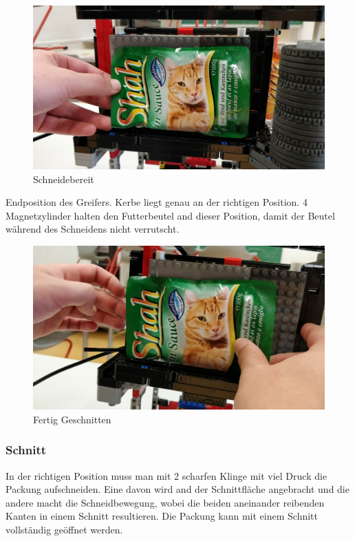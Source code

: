 \begin{figure}[H]
\begin{center}
\includegraphics[width=13cm]{Bilder/Ablauf_1_png/Schneidebereit.jpeg}
\caption{Schneidebereit}
\end{center}
\end{figure}

Endposition des Greifers. Kerbe liegt genau an der richtigen Position. 4 Magnetzylinder halten den Futterbeutel and dieser Position, damit der Beutel während des Schneidens nicht verrutscht.

\begin{figure}[H]
\begin{center}
\includegraphics[width=13cm]{Bilder/Ablauf_1_png/Fertig_Geschnitten}
\caption{Fertig Geschnitten}
\end{center}
\end{figure}

\newpage
\subsubsection{Schnitt}

In der richtigen Position muss man mit 2 scharfen Klinge mit viel Druck die Packung aufschneiden. Eine davon wird and der Schnittfläche angebracht und die andere macht die Schneidbewegung, wobei die beiden aneinander reibenden Kanten in einem Schnitt resultieren. Die Packung kann mit einem Schnitt vollständig geöffnet werden.

